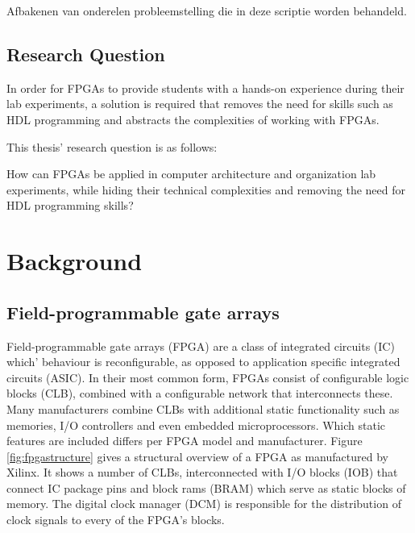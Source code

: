 \documentclass[openright]{template/uva-bachelor-thesis}
\begin{document}
Afbakenen van onderelen probleemstelling die in deze scriptie worden behandeld.


\section{Research Question}

In order for FPGAs to provide students with a hands-on experience during their lab experiments, a solution is required 
that removes the need for skills such as HDL programming and abstracts the complexities of working with FPGAs.

This thesis' research question is as follows: 

\begin{displayquote}
How can FPGAs be applied in computer architecture and organization lab experiments, while hiding their technical complexities and removing the need for HDL programming skills?
\end{displayquote}







\chapter{Background}


\section{Field-programmable gate arrays}
Field-programmable gate arrays (FPGA) are a class of integrated circuits (IC) which' behaviour is reconfigurable, as opposed to application specific integrated circuits (ASIC). In their most common form, FPGAs consist of configurable logic blocks (CLB), combined with a configurable network that interconnects these. Many manufacturers combine CLBs with additional static functionality such as memories, I/O controllers and even embedded microprocessors. Which static features are included differs per FPGA model and manufacturer. Figure \ref{fig:fpgastructure} gives a structural overview of a FPGA as manufactured by Xilinx. It shows a number of CLBs, interconnected with I/O blocks (IOB) that connect IC package pins and block rams (BRAM) which serve as static blocks of memory. The digital clock manager (DCM) is responsible for the distribution of clock signals to every of the FPGA's blocks. 
\end{document}
